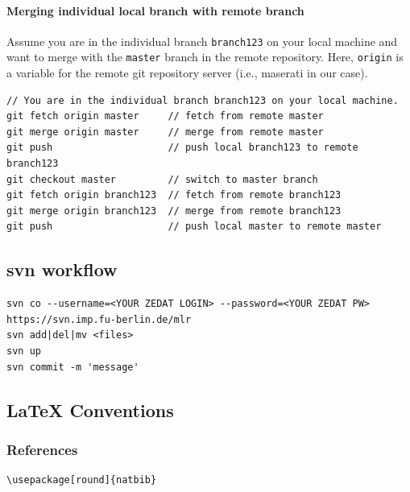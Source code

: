 \paragraph{Merging individual local branch with remote branch}

Assume you are in the individual branch \verb+branch123+ on your local machine and want to merge
with the \verb+master+ branch in the remote repository. Here, \verb+origin+ is a variable
for the remote git repository server (i.e., maserati in our case).
\begin{verbatim}
// You are in the individual branch branch123 on your local machine.
git fetch origin master     // fetch from remote master
git merge origin master     // merge from remote master
git push                    // push local branch123 to remote branch123
git checkout master         // switch to master branch
git fetch origin branch123  // fetch from remote branch123
git merge origin branch123  // merge from remote branch123
git push                    // push local master to remote master
\end{verbatim}






\subsection{svn workflow}

\begin{code}
\begin{verbatim}
svn co --username=<YOUR ZEDAT LOGIN> --password=<YOUR ZEDAT PW> https://svn.imp.fu-berlin.de/mlr
svn add|del|mv <files>
svn up
svn commit -m 'message'
\end{verbatim}
\end{code}



\subsection{LaTeX Conventions}

\subsubsection{References}

\begin{code}
\begin{verbatim}
\usepackage[round]{natbib}

\end{verbatim}
\end{code}

